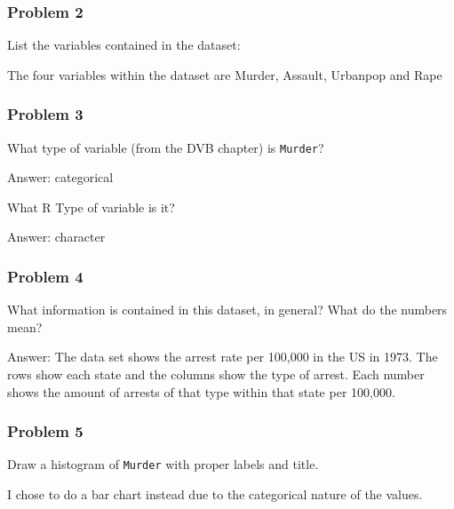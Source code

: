 \documentclass[
]{article}
\newenvironment{Shaded}{\begin{snugshade}}{\end{snugshade}}
\newcommand{\DataTypeTok}[1]{\textcolor[rgb]{0.13,0.29,0.53}{#1}}
\newcommand{\DecValTok}[1]{\textcolor[rgb]{0.00,0.00,0.81}{#1}}
\newcommand{\KeywordTok}[1]{\textcolor[rgb]{0.13,0.29,0.53}{\textbf{#1}}}
\newcommand{\NormalTok}[1]{#1}
\newcommand{\OperatorTok}[1]{\textcolor[rgb]{0.81,0.36,0.00}{\textbf{#1}}}
\newcommand{\StringTok}[1]{\textcolor[rgb]{0.31,0.60,0.02}{#1}}
\begin{document}
\hypertarget{problem-2}{%
\subsubsection{Problem 2}\label{problem-2}}

List the variables contained in the dataset:

The four variables within the dataset are Murder, Assault, Urbanpop and
Rape

\hypertarget{problem-3}{%
\subsubsection{Problem 3}\label{problem-3}}

What type of variable (from the DVB chapter) is \texttt{Murder}?

Answer: categorical

What R Type of variable is it?

Answer: character

\hypertarget{problem-4}{%
\subsubsection{Problem 4}\label{problem-4}}

What information is contained in this dataset, in general? What do the
numbers mean?

Answer: The data set shows the arrest rate per 100,000 in the US in
1973. The rows show each state and the columns show the type of arrest.
Each number shows the amount of arrests of that type within that state
per 100,000.

\hypertarget{problem-5}{%
\subsubsection{Problem 5}\label{problem-5}}

Draw a histogram of \texttt{Murder} with proper labels and title.

I chose to do a bar chart instead due to the categorical nature of the
values.

\begin{Shaded}
\end{Shaded}
\end{document}
